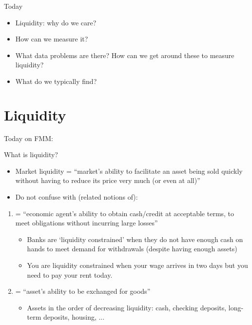 \documentclass[english,10pt]{beamer}
\begin{document}
\begin{frame}{Today}
	\begin{itemize}
		\item Liquidity: why do we care?
		\item How can we measure it?
		\item What data problems are there? How can we get around these to measure liquidity?
		\item What do we typically find?
	\end{itemize}
\end{frame}


\section{Liquidity}

\begin{frame}{Today on FMM:}
	\tableofcontents[currentsection]
\end{frame}


\begin{frame}{What is liquidity?}
\begin{itemize}
	\item \alert{Market liquidity} = ``market's ability to facilitate an asset being sold quickly without having to reduce its price very much (or even at all)''
	\item Do not confuse with (related notions of):
\end{itemize}
\begin{enumerate}
	\item {} = ``economic agent's ability to obtain cash/credit at acceptable terms, to meet obligations without incurring large losses''
	\begin{itemize}
		\item Banks are `liquidity constrained' when they do not have enough cash on hands to meet demand for withdrawals (despite having enough assets)
		\item You are liquidity constrained when your wage arrives in two days but you need to pay your rent today.
	\end{itemize}
	\item {} = ``asset's ability to be exchanged for goods''
	\begin{itemize}
		\item Assets in the order of decreasing liquidity: cash, checking deposits, long-term deposits, housing, ...
	\end{itemize}
\end{enumerate}
\end{frame}
\end{document}
